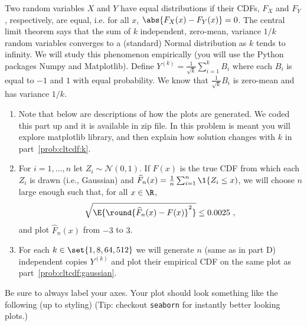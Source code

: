 \documentclass{article}
\begin{document}
\begin{aprob}
\end{aprob}

\newpage
\begin{aprob}
     Two random variables $X$ and $Y$ have equal  distributions if their CDFs, $F_X$ and $F_Y$, respectively, are equal, i.e. for all $x$, $ \abs{F_X(x) - F_Y(x)} = 0$. 
    The central limit theorem says that the sum of $k$ independent, zero-mean, variance $1/k$ random variables converges to a (standard) Normal distribution as $k$ tends to infinity.  
    We will study this phenomenon empirically (you will use the Python packages Numpy and Matplotlib).
    Define $Y^{(k)} = \frac{1}{\sqrt{k}} \sum_{i=1}^k B_i$ where each $B_i$ is equal to $-1$ and $1$ with equal probability.
    We know that $\frac{1}{\sqrt{k}} B_i$ is zero-mean and has variance $1/k$.
    \begin{enumerate}
    \item Note that below are descriptions of how the plots are generated. We coded this part up and it is available in zip file. In this problem is meant you will explore matplotlib library, and then explain how solution changes with $k$ in part~\ref{prob:cltcdf:k}.
    \item \label{prob:cltcdf:gaussian} For $i=1,\ldots,n$ let $Z_i \sim \mathcal{N}(0,1)$. If $F(x)$ is the true CDF from which each $Z_i$ is drawn (i.e.,  Gaussian) and $\widehat{F}_n(x) = \frac{1}{n} \sum_{i=1}^n \1\{ Z_i \leq x)$, we will choose $n$ large enough such that, for all $x \in \R$,
    \[
    	\sqrt{\E{\round{\widehat{F}_n(x)-F(x)}^2 }} \leq 0.0025\ ,
    \]
    and plot $\widehat{F}_n(x)$ from $-3$ to $3$.

    \item \label{prob:cltcdf:k} For each $k \in \set{1, 8, 64, 512}$ we will generate $n$ (same as in part D) independent copies $Y^{(k)}$ and plot their empirical CDF on the same plot as part~\ref{prob:cltcdf:gaussian}.
    \end{enumerate}
    Be sure to always label your axes.
    Your plot should look something like the following (up to styling) (Tip: checkout \texttt{seaborn} for instantly better looking plots.)


\end{aprob}
\end{document}

